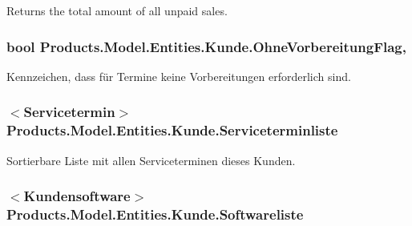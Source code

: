 Returns the total amount of all unpaid sales. 

\subsubsection[{\texorpdfstring{Ohne\+Vorbereitung\+Flag}{OhneVorbereitungFlag}}]{\setlength{\rightskip}{0pt plus 5cm}bool Products.\+Model.\+Entities.\+Kunde.\+Ohne\+Vorbereitung\+Flag\hspace{0.3cm}{\ttfamily [get]}, {\ttfamily [set]}}\hypertarget{class_products_1_1_model_1_1_entities_1_1_kunde_af0241c99ba6ea75e9869d710e2639955}{}\label{class_products_1_1_model_1_1_entities_1_1_kunde_af0241c99ba6ea75e9869d710e2639955}


Kennzeichen, dass für Termine keine Vorbereitungen erforderlich sind. 

\subsubsection[{\texorpdfstring{Serviceterminliste}{Serviceterminliste}}]{$<${\bf Servicetermin}$>$ Products.\+Model.\+Entities.\+Kunde.\+Serviceterminliste\hspace{0.3cm}{\ttfamily [get]}}\hypertarget{class_products_1_1_model_1_1_entities_1_1_kunde_aa0355e6fb3d7750ef96f95b4ebedcae7}{}\label{class_products_1_1_model_1_1_entities_1_1_kunde_aa0355e6fb3d7750ef96f95b4ebedcae7}


Sortierbare Liste mit allen Serviceterminen dieses Kunden. 

\subsubsection[{\texorpdfstring{Softwareliste}{Softwareliste}}]{$<${\bf Kundensoftware}$>$ Products.\+Model.\+Entities.\+Kunde.\+Softwareliste\hspace{0.3cm}{\ttfamily [get]}}\hypertarget{class_products_1_1_model_1_1_entities_1_1_kunde_ac3b0ecf32f4f852804361d5ce6bc47c7}{}\label{class_products_1_1_model_1_1_entities_1_1_kunde_ac3b0ecf32f4f852804361d5ce6bc47c7}



